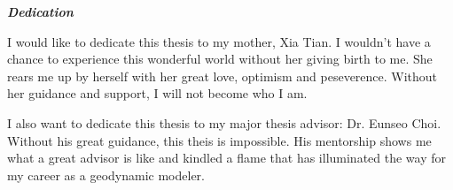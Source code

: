 \begin{center}
\textbf{\textit{Dedication}}
\end{center}

I would like to dedicate this thesis to my mother, Xia Tian. I wouldn't have a chance to experience this wonderful world without her giving birth to me. She rears me up by herself with her great love, optimism and peseverence. Without her guidance and support, I will not become who I am.

I also want to dedicate this thesis to my major thesis advisor: Dr. Eunseo Choi. Without his great guidance, this theis is impossible. His mentorship shows me what a great advisor is like and kindled a flame that has illuminated the way for my career as a geodynamic modeler.   

